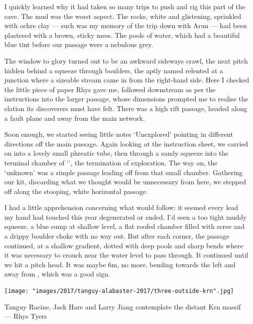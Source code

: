 I quickly learned why it had taken so many trips to push and rig this part of the cave. The mud was the worst aspect. The rocks, white and glistening, sprinkled with ochre clay --- such was my memory of the trip down  with Arun --- had been plastered with a brown, sticky mess. The pools of water, which had a beautiful blue tint before our passage were a nebulous grey.  

The window to glory turned out to be an awkward sideways crawl,  the next pitch hidden behind a squeeze through boulders, the aptly named  relented at a junction where a sizeable stream came in from the right-hand side. Here I checked the little piece of paper Rhys gave me, followed downstream as per the instructions into the larger  passage, whose dimensions prompted me to realise the elation its discoverers must have felt. There was a high rift passage, headed along a fault plane and away from the main  network.


Soon enough, we started seeing little notes `Unexplored' pointing in different directions off the main passage.  Again looking at the instruction sheet, we carried on into a lovely small phreatic tube, then through a sandy squeeze into the terminal chamber of `', the termination of exploration. The way on, the `unknown' was a simple passage leading off from that small chamber. Gathering our kit, discarding what we thought would be unnecessary from here, we stepped off along the stooping, white horizontal passage. 

I had a little apprehension concerning what would follow: it seemed every lead my hand had touched this year degenerated or ended. I'd seen a too tight muddy squeeze, a blue sump at shallow level, a flat roofed chamber filled with scree and a drippy boulder choke with no way out. But after each corner, the passage continued, at a shallow gradient, dotted with deep pools and sharp bends where it was necessary to crouch near the water level to pass through. It continued until we hit a pitch head. It was maybe 6m, no more, bending towards the left and away from , which was a good sign. 

\begin{pagefigure} \centering
\texttt{[image: "images/2017/tanguy-alabaster-2017/three-outside-krn".jpg]}
\caption{Tanguy Racine, Jack Hare and Larry Jiang contemplate the distant Krn massif --- Rhys Tyers}
\end{pagefigure}

